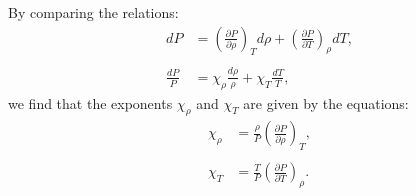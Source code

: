 \documentclass[main.tex]{subfiles}
\begin{document}
By comparing the relations:
\begin{align*}
    \label{apx:eq:differential_form_of_eos}
    dP &= \left( \frac{\partial P}{\partial \rho} \right)_T d\rho + \left( \frac{\partial P}{\partial T} \right)_\rho dT, \\\\
    \frac{dP}{P} &= \chi_\rho \frac{d\rho}{\rho} + \chi_T \frac{dT}{T},
\end{align*}
we find that the exponents $\chi_\rho$ and $\chi_T$ are given by the equations:
\begin{align*}
    \chi_\rho &= \frac{\rho}{P} \left( \frac{\partial P}{\partial \rho} \right)_T, \\\\
    \chi_T &= \frac{T}{P} \left( \frac{\partial P}{\partial T} \right)_\rho.
\end{align*}
\end{document}
